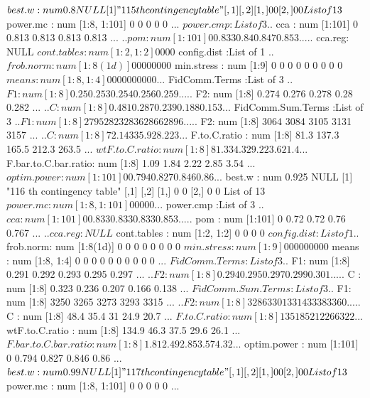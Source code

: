 \documentclass[11pt]{article} %
\begin{document}
\begin{Schunk}
\begin{Soutput}
 $ best.w              : num 0.8
NULL
[1] "115 th contingency table"
     [,1] [,2]
[1,]    0    0
[2,]    0    0
List of 13
 $ power.mc            : num [1:8, 1:101] 0 0 0 0 0 ...
 $ power.cmp           :List of 3
  ..$ cca    : num [1:101] 0 0.813 0.813 0.813 0.813 ...
  ..$ pom    : num [1:101] 0 0.833 0.84 0.847 0.853 ...
  ..$ cca.reg: NULL
 $ cont.tables         : num [1:2, 1:2] 0 0 0 0
 $ config.dist         :List of 1
  ..$ frob.norm: num [1:8(1d)] 0 0 0 0 0 0 0 0
 $ min.stress          : num [1:9] 0 0 0 0 0 0 0 0 0
 $ means               : num [1:8, 1:4] 0 0 0 0 0 0 0 0 0 0 ...
 $ FidComm.Terms       :List of 3
  ..$ F1: num [1:8] 0.25 0.253 0.254 0.256 0.259 ...
  ..$ F2: num [1:8] 0.274 0.276 0.278 0.28 0.282 ...
  ..$ C : num [1:8] 0.481 0.287 0.239 0.188 0.153 ...
 $ FidComm.Sum.Terms   :List of 3
  ..$ F1: num [1:8] 2795 2823 2836 2866 2896 ...
  ..$ F2: num [1:8] 3064 3084 3105 3131 3157 ...
  ..$ C : num [1:8] 72.1 43 35.9 28.2 23 ...
 $ F.to.C.ratio        : num [1:8] 81.3 137.3 165.5 212.3 263.5 ...
 $ wtF.to.C.ratio      : num [1:8] 81.3 34.3 29.2 23.6 21.4 ...
 $ F.bar.to.C.bar.ratio: num [1:8] 1.09 1.84 2.22 2.85 3.54 ...
 $ optim.power         : num [1:101] 0 0.794 0.827 0.846 0.86 ...
 $ best.w              : num 0.925
NULL
[1] "116 th contingency table"
     [,1] [,2]
[1,]    0    0
[2,]    0    0
List of 13
 $ power.mc            : num [1:8, 1:101] 0 0 0 0 0 ...
 $ power.cmp           :List of 3
  ..$ cca    : num [1:101] 0 0.833 0.833 0.833 0.853 ...
  ..$ pom    : num [1:101] 0 0.72 0.72 0.76 0.767 ...
  ..$ cca.reg: NULL
 $ cont.tables         : num [1:2, 1:2] 0 0 0 0
 $ config.dist         :List of 1
  ..$ frob.norm: num [1:8(1d)] 0 0 0 0 0 0 0 0
 $ min.stress          : num [1:9] 0 0 0 0 0 0 0 0 0
 $ means               : num [1:8, 1:4] 0 0 0 0 0 0 0 0 0 0 ...
 $ FidComm.Terms       :List of 3
  ..$ F1: num [1:8] 0.291 0.292 0.293 0.295 0.297 ...
  ..$ F2: num [1:8] 0.294 0.295 0.297 0.299 0.301 ...
  ..$ C : num [1:8] 0.323 0.236 0.207 0.166 0.138 ...
 $ FidComm.Sum.Terms   :List of 3
  ..$ F1: num [1:8] 3250 3265 3273 3293 3315 ...
  ..$ F2: num [1:8] 3286 3301 3314 3338 3360 ...
  ..$ C : num [1:8] 48.4 35.4 31 24.9 20.7 ...
 $ F.to.C.ratio        : num [1:8] 135 185 212 266 322 ...
 $ wtF.to.C.ratio      : num [1:8] 134.9 46.3 37.5 29.6 26.1 ...
 $ F.bar.to.C.bar.ratio: num [1:8] 1.81 2.49 2.85 3.57 4.32 ...
 $ optim.power         : num [1:101] 0 0.794 0.827 0.846 0.86 ...
 $ best.w              : num 0.99
NULL
[1] "117 th contingency table"
     [,1] [,2]
[1,]    0    0
[2,]    0    0
List of 13
 $ power.mc            : num [1:8, 1:101] 0 0 0 0 0 ...

\end{Soutput}
\end{Schunk}
\end{document}
